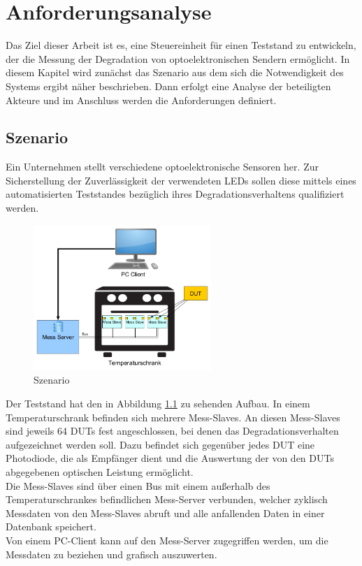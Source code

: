 
\chapter{Anforderungsanalyse}
\label{chapter_Anforderungsanalyse}
Das Ziel dieser Arbeit ist es, eine Steuereinheit für einen Teststand zu entwickeln, der die Messung der Degradation von optoelektronischen Sendern ermöglicht. In diesem Kapitel wird zunächst das Szenario aus dem sich die Notwendigkeit des Systems ergibt näher beschrieben. Dann erfolgt eine Analyse der beteiligten Akteure und im Anschluss werden die Anforderungen definiert.

\section{Szenario}
Ein Unternehmen stellt verschiedene optoelektronische Sensoren her. Zur Sicherstellung der Zuverlässigkeit der verwendeten \acp{LED} sollen diese mittels eines automatisierten Teststandes bezüglich ihres Degradationsverhaltens qualifiziert werden.


\begin{figure}[H]
\begin{center}
\includegraphics[width=0.6\textwidth]{img/general/Szenario.png}
\caption{Szenario}
\label{figure_Szenario}
\end{center}
\end{figure}

Der Teststand hat den in Abbildung \ref{figure_Szenario} zu sehenden Aufbau.
In einem Temperaturschrank befinden sich mehrere Mess-Slaves. An diesen Mess-Slaves sind jeweils 64 \acp{DUT} fest angeschlossen, bei denen das Degradationsverhalten aufgezeichnet werden soll. Dazu befindet sich gegenüber jedes \ac{DUT} eine Photodiode, die als Empfänger dient und die Auswertung der von den \acp{DUT} abgegebenen optischen Leistung ermöglicht.\\
Die Mess-Slaves sind über einen Bus mit einem außerhalb des Temperaturschrankes befindlichen Mess-Server verbunden, welcher zyklisch Messdaten von den Mess-Slaves abruft und alle anfallenden Daten in einer Datenbank speichert.\\
Von einem PC-Client kann auf den Mess-Server zugegriffen  werden, um die Messdaten zu beziehen und grafisch auszuwerten.\\

